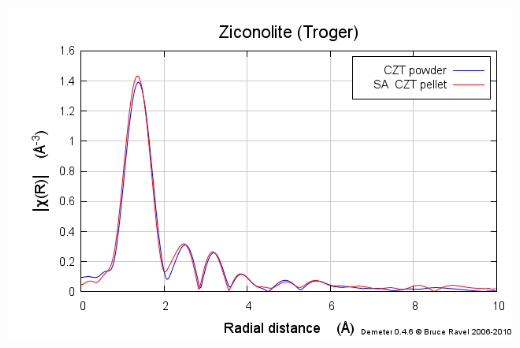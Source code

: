 \documentclass[10pt, xcolor=x11names, compress]{beamer}
\begin{document}
\begin{frame}
\begin{columns}
\begin{column}{0.5\linewidth}
\begin{center}
        \includegraphics[width=0.8\linewidth]{images/zirconolite_chir.png}
      \end{center}
    \end{column}
  \end{columns}
\end{frame}
\end{document}
